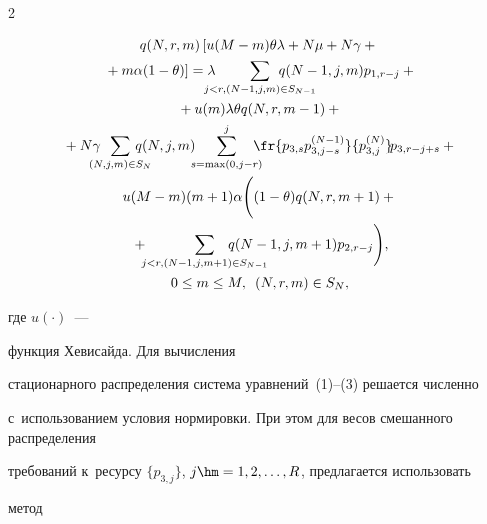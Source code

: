 \begin{multicols}{2}
\noindent

\begin{multline}

 q(N,r,m) \left[ u(M-m)\theta\lambda +N\mu + N\gamma +{}\right.\\

 \left.{}+ m\alpha(1-\theta) 

\right] = \lambda \!\!\!\!\!\! \sum\limits_{j<r, (N-1,j,m) \in S_{N-1}} \!\!\!\!\!\!\!\!\!\!\!\!\!\!\!\!\!

q(N-1,j,m)p_{1,r-j} + {} \\

{}+u(m) \lambda \theta q(N,r,m-1) + {}\\

{}+ N\gamma \!\!\!\!\!\! \sum\limits_{(N,j,m) \in S_N} 

\!\!\!\!\!\!\!\! q(N,j,m) \!\!\!\sum\limits_{s=\max(0,j-r)}^j \! \!\!\!\!\fr{ p_{3,s} p_{3,j-s}^{(N-1)} }{ 

p_{3,j}^{(N)} } \!p_{3,r-j+s} + {}\\

u(M-m)(m+1)\alpha

\Bigg( (1-\theta)q(N,r,m+1) + {}\\

{}+\!\!\! \sum\limits_{j<r, (N-1,j,m+1) \in 

S_{N-1}} \!\!\!\!\!\!\!\!\!\!\!\!\!\!\!\!\!\! q(N-1,j,m+1)p_{2,r-j} \Bigg),\\

 0 \leq m \leq M, \enskip (N,r,m) \in S_N,

\end{multline}





\noindent

где $u(\cdot)$~--- 

функ\-ция Хевисайда. Для вы\-чис\-ле\-ния 

стационарного распределения сис\-те\-ма уравнений~(1)--(3) решается чис\-лен\-но 

с~использованием условия нормировки. При этом для весов смешанного распределения 

требований к~ресурсу $\{ p_{3 ,j}\}$, $j\hm=1,2,\ldots ,R$, предлагается использовать 

метод\linebreak

\vspace*{-12pt}




\end{multicols}
